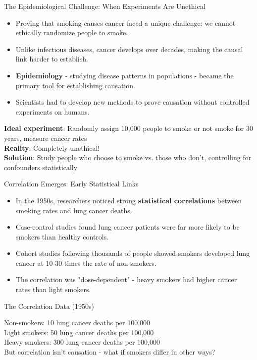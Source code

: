 \documentclass{beamer}
\begin{document}
	\begin{frame}{The Epidemiological Challenge: When Experiments Are Unethical}
		\begin{itemize}
			\item Proving that smoking causes cancer faced a unique challenge: we cannot ethically randomize people to smoke.
			\item Unlike infectious diseases, cancer develops over decades, making the causal link harder to establish.
			\item \textbf{Epidemiology} - studying disease patterns in populations - became the primary tool for establishing causation.
			\item Scientists had to develop new methods to prove causation without controlled experiments on humans.
		\end{itemize}
		
		\begin{example}
			\textbf{Ideal experiment}: Randomly assign 10,000 people to smoke or not smoke for 30 years, measure cancer rates\\
			\textbf{Reality}: Completely unethical!\\
			\textbf{Solution}: Study people who choose to smoke vs. those who don't, controlling for confounders statistically
		\end{example}
	\end{frame}
	
	\begin{frame}{Correlation Emerges: Early Statistical Links}
		\begin{itemize}
			\item In the 1950s, researchers noticed strong \textbf{statistical correlations} between smoking rates and lung cancer deaths.
			\item Case-control studies found lung cancer patients were far more likely to be smokers than healthy controls.
			\item Cohort studies following thousands of people showed smokers developed lung cancer at 10-30 times the rate of non-smokers.
			\item The correlation was "dose-dependent" - heavy smokers had higher cancer rates than light smokers.
		\end{itemize}
		
		\begin{alertblock}{The Correlation Data (1950s)}
			\begin{center}
				Non-smokers: 10 lung cancer deaths per 100,000\\
				Light smokers: 50 lung cancer deaths per 100,000\\
				Heavy smokers: 300 lung cancer deaths per 100,000\\
				\vspace{0.2cm}
				But correlation isn't causation - what if smokers differ in other ways?
			\end{center}
		\end{alertblock}
	\end{frame}
	
\end{document}

